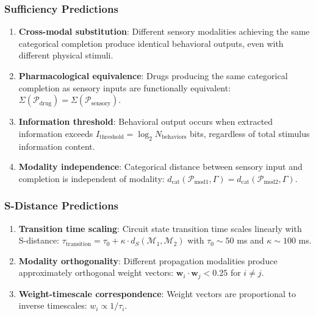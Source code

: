 \documentclass[aps,prd,twocolumn,superscriptaddress,floatfix,nofootinbib]{revtex4-2}
\theoremstyle{remark}
\begin{document}
\subsubsection{Sufficiency Predictions}

\begin{enumerate}
\item \textbf{Cross-modal substitution}: Different sensory modalities achieving the same categorical completion produce identical behavioral outputs, even with different physical stimuli.

\item \textbf{Pharmacological equivalence}: Drugs producing the same categorical completion as sensory inputs are functionally equivalent: $\Sigma(\mathcal{P}_{\text{drug}}) = \Sigma(\mathcal{P}_{\text{sensory}})$.

\item \textbf{Information threshold}: Behavioral output occurs when extracted information exceeds $I_{\text{threshold}} = \log_2 N_{\text{behaviors}}$ bits, regardless of total stimulus information content.

\item \textbf{Modality independence}: Categorical distance between sensory input and completion is independent of modality: $d_{\text{cat}}(\mathcal{P}_{\text{mod1}}, \Gamma) = d_{\text{cat}}(\mathcal{P}_{\text{mod2}}, \Gamma)$.
\end{enumerate}

\subsubsection{S-Distance Predictions}

\begin{enumerate}
\item \textbf{Transition time scaling}: Circuit state transition time scales linearly with S-distance: $\tau_{\text{transition}} = \tau_0 + \kappa \cdot d_S(\mathcal{M}_1, \mathcal{M}_2)$ with $\tau_0 \sim 50$ ms and $\kappa \sim 100$ ms.

\item \textbf{Modality orthogonality}: Different propagation modalities produce approximately orthogonal weight vectors: $\mathbf{w}_i \cdot \mathbf{w}_j < 0.25$ for $i \neq j$.

\item \textbf{Weight-timescale correspondence}: Weight vectors are proportional to inverse timescales: $w_i \propto 1/\tau_i$.
\end{enumerate}
\end{document}
